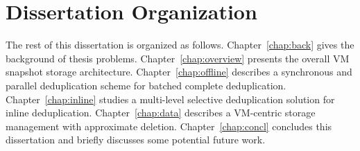 \section{Dissertation Organization}
\label{intro:organ}
The rest of this dissertation is organized as follows.  
Chapter~\ref{chap:back} gives the background of thesis problems.
Chapter~\ref{chap:overview} presents the overall VM snapshot storage architecture.
Chapter~\ref{chap:offline}  describes a synchronous and parallel deduplication scheme for batched complete deduplication.
Chapter~\ref{chap:inline} studies a multi-level selective deduplication solution for inline deduplication.
Chapter~\ref{chap:data}  describes a VM-centric storage management with approximate deletion.
Chapter~\ref{chap:concl}  concludes this  dissertation  and  briefly discusses some potential future work.

